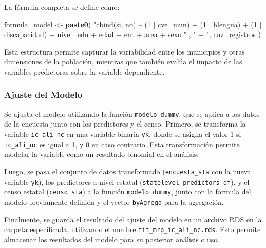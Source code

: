 \documentclass[
  12pt,
]{book}
\newenvironment{Shaded}{\begin{snugshade}}{\end{snugshade}}
\newcommand{\FunctionTok}[1]{\textcolor[rgb]{0.13,0.29,0.53}{\textbf{#1}}}
\newcommand{\NormalTok}[1]{#1}
\newcommand{\OtherTok}[1]{\textcolor[rgb]{0.56,0.35,0.01}{#1}}
\newcommand{\StringTok}[1]{\textcolor[rgb]{0.31,0.60,0.02}{#1}}
\begin{document}
La fórmula completa se define como:

\begin{Shaded}
\begin{Highlighting}[]
\NormalTok{formula\_model }\OtherTok{\textless{}{-}}
  \FunctionTok{paste0}\NormalTok{(}
    \StringTok{"cbind(si, no) \textasciitilde{} (1 | cve\_mun) + (1 | hlengua) + (1 | discapacidad) +  nivel\_edu + edad  + ent + area + sexo "}
\NormalTok{    ,}
    \StringTok{" + "}\NormalTok{,}
\NormalTok{    cov\_registros}
\NormalTok{  )}
\end{Highlighting}
\end{Shaded}

Esta estructura permite capturar la variabilidad entre los municipios y otras dimensiones de la población, mientras que también evalúa el impacto de las variables predictoras sobre la variable dependiente.

\hypertarget{ajuste-del-modelo-1}{%
\subsubsection*{Ajuste del Modelo}\label{ajuste-del-modelo-1}}

Se ajusta el modelo utilizando la función \texttt{modelo\_dummy}, que se aplica a los datos de la encuesta junto con los predictores y el censo. Primero, se transforma la variable \texttt{ic\_ali\_nc} en una variable binaria \texttt{yk}, donde se asigna el valor 1 si \texttt{ic\_ali\_nc} es igual a 1, y 0 en caso contrario. Esta transformación permite modelar la variable como un resultado binomial en el análisis.

Luego, se pasa el conjunto de datos transformado (\texttt{encuesta\_sta} con la nueva variable \texttt{yk}), los predictores a nivel estatal (\texttt{statelevel\_predictors\_df}), y el censo estatal (\texttt{censo\_sta}) a la función \texttt{modelo\_dummy}, junto con la fórmula del modelo previamente definida y el vector \texttt{byAgrega} para la agregación.

Finalmente, se guarda el resultado del ajuste del modelo en un archivo RDS en la carpeta especificada, utilizando el nombre \texttt{fit\_mrp\_ic\_ali\_nc.rds}. Esto permite almacenar los resultados del modelo para su posterior análisis o uso.
\end{document}
